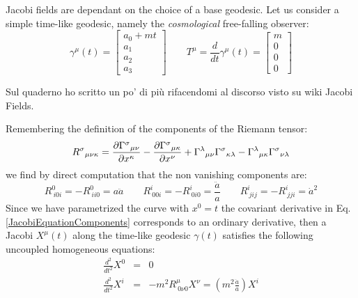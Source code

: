 \documentclass[Main]{subfiles}
\begin{document}
			Jacobi fields are dependant on the choice of a base geodesic. 
			Let us consider a simple time-like geodesic, namely the \emph{cosmological} free-falling observer:
			\begin{displaymath}
				\gamma^\mu (t) = \begin{bmatrix}  a_0 + m t \\  a_1 \\ a_2 \\ a_3  \end{bmatrix}
				\qquad
				T^\mu=\frac{d}{d t}\gamma^\mu(t)= \begin{bmatrix}  m \\  0 \\ 0 \\ 0  \end{bmatrix}
			\end{displaymath}
\ifToninus
	\begin{Warning}
		Sul quaderno ho scritto un po' di più rifacendomi al discorso visto su wiki Jacobi Fields.
	\end{Warning}
\fi
			Remembering the definition of the components of the Riemann tensor:
			\begin{displaymath}
				{R^\sigma}_{\mu\nu\kappa} =
				  {\partial{\Gamma^\sigma}_{\mu\nu} \over \partial x^\kappa} -
				  {\partial{\Gamma^\sigma}_{\mu\kappa} \over \partial x^\nu} +
				  {\Gamma^\lambda}_{\mu\nu}{\Gamma^\sigma}_{\kappa\lambda} -
				  {\Gamma^\lambda}_{\mu\kappa}{\Gamma^\sigma}_{\nu\lambda}		
			\end{displaymath}			 
			we find by direct computation  that the non vanishing components are:
			\begin{equation}
				R^0_{\: i 0 i}= - R^{0}_{\: i i 0}= a \ddot{a} \qquad
				R^i_{\: 0 0 i}=-R^i_{\: 0 i 0}=	\dfrac{\ddot{a}}{a}\qquad
				R^i_{\: j i j} = - R^i_{\: j j i} = \dot{a}^2				
			\end{equation}
			Since we have parametrized the curve with $x^0 = t$ the covariant derivative in Eq. \ref{JacobiEquationComponents}  corresponds to an ordinary derivative, then a Jacobi $X^\mu(t)$ along the time-like geodesic $\gamma(t)$ satisfies the following uncoupled homogeneous equations:
			\begin{eqnarray}
				\frac{d^2}{d t^2} X^0  &=& 0 \label{FRWJacobi1}\\
				\frac{d^2}{d t^2} X^i &= &- m^2 R^{\mu}_{\: 0 \nu 0} X^\nu = \left( m^2 \frac{\ddot{a}}{a}\right) X^i 	\label{FRWJacobi2}	
			\end{eqnarray}			
			\vspace{2mm}
			
\end{document}
